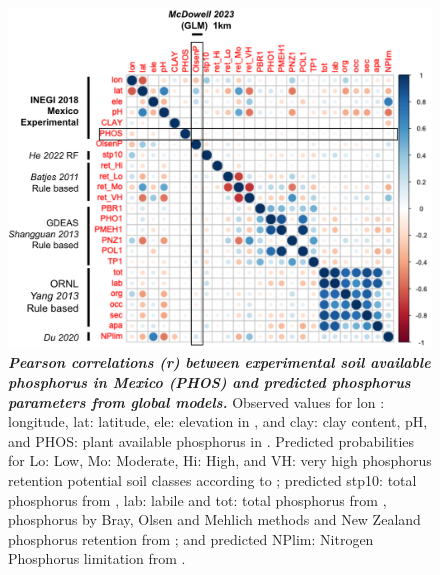 \begin{figure}[!ht]
\centering
\includegraphics[width=0.65\paperwidth]{Chapter-2/figs/PHOS_correlation.png}
\caption[Pearson correlations (r) between experimental soil available phosphorus in Mexico (PHOS) and predicted phosphorus parameters from global models]{\textit{\textbf{Pearson correlations (r) between experimental soil available phosphorus in Mexico (PHOS) and predicted phosphorus parameters from global models.}} Observed values for lon : longitude, lat: latitude, ele: elevation in \citep{inegi2013}, and clay: clay content, pH, and PHOS: plant available phosphorus in \citep{inegi2013}. Predicted probabilities for Lo: Low, Mo: Moderate, Hi: High, and VH: very high phosphorus retention potential soil classes according to \citep{batjes2011}; predicted
stp10: total phosphorus from \citep{hexianjin2022}, lab: labile and tot: total phosphorus from \citep{yang2013}, phosphorus by Bray, Olsen and Mehlich \citep{mehlich1984} methods and New Zealand phosphorus retention  from \citep{shangguan2014}; and predicted NPlim: Nitrogen Phosphorus limitation from \citep{du2020}. } 
\label{fig::phoscorrelation}
\end{figure}
\clearpage

